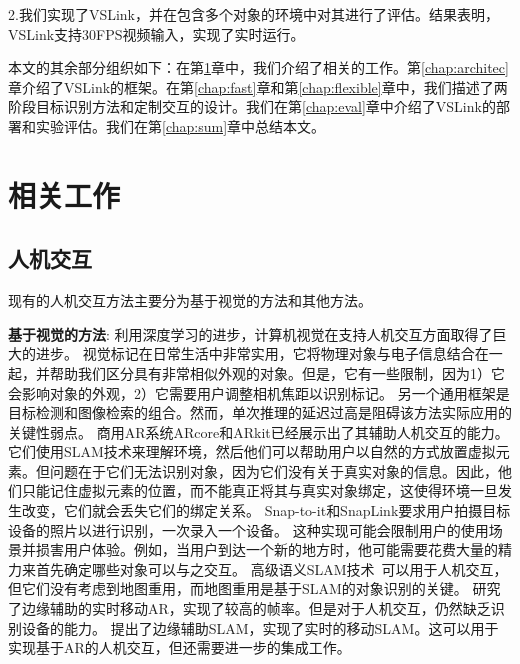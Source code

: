 2.我们实现了VSLink，并在包含多个对象的环境中对其进行了评估。结果表明，VSLink支持30FPS视频输入，实现了实时运行。

本文的其余部分组织如下：在第\ref{chap:related}章中，我们介绍了相关的工作。第\ref{chap:architec}章介绍了VSLink的框架。在第\ref{chap:fast}章和第\ref{chap:flexible}章中，我们描述了两阶段目标识别方法和定制交互的设计。我们在第\ref{chap:eval}章中介绍了VSLink的部署和实验评估。我们在第\ref{chap:sum}章中总结本文。



\chapter{相关工作}
\label{chap:related}
\section{人机交互}
现有的人机交互方法主要分为基于视觉的方法和其他方法。

\textbf{基于视觉的方法}: 
利用深度学习的进步，计算机视觉在支持人机交互方面取得了巨大的进步。
视觉标记\cite{wang2010design,olson2011apriltag}在日常生活中非常实用，它将物理对象与电子信息结合在一起，并帮助我们区分具有非常相似外观的对象。但是，它有一些限制，因为1）它会影响对象的外观，2）它需要用户调整相机焦距以识别标记。
另一个通用框架是目标检测\cite{ren2015faster,redmon2018yolov3,qin2019thundernet}和图像检索\cite{philbin2008lost,zheng2017sift}的组合。然而，单次推理的延迟过高是阻碍该方法实际应用的关键性弱点。
商用AR系统ARcore\cite{arcore}和ARkit\cite{arkit}已经展示出了其辅助人机交互的能力。
它们使用SLAM技术来理解环境，然后他们可以帮助用户以自然的方式放置虚拟元素。但问题在于它们无法识别对象，因为它们没有关于真实对象的信息。因此，他们只能记住虚拟元素的位置，而不能真正将其与真实对象绑定，这使得环境一旦发生改变，它们就会丢失它们的绑定关系。
Snap-to-it\cite{de2016snap}和SnapLink\cite{chen2018snaplink}要求用户拍摄目标设备的照片以进行识别，一次录入一个设备。
这种实现可能会限制用户的使用场景并损害用户体验。例如，当用户到达一个新的地方时，他可能需要花费大量的精力来首先确定哪些对象可以与之交互。
高级语义SLAM技术~\cite{strecke2019fusion,runz2018maskfusion,salas2013slam++}可以用于人机交互，但它们没有考虑到地图重用，而地图重用是基于SLAM的对象识别的关键。
\cite{liu2019edge}研究了边缘辅助的实时移动AR，实现了较高的帧率。但是对于人机交互，\cite{liu2019edge}仍然缺乏识别设备的能力。
\cite{ben2020edge,xu2020edge,liu2021edgesharing}提出了边缘辅助SLAM，实现了实时的移动SLAM。这可以用于实现基于AR的人机交互，但还需要进一步的集成工作。

